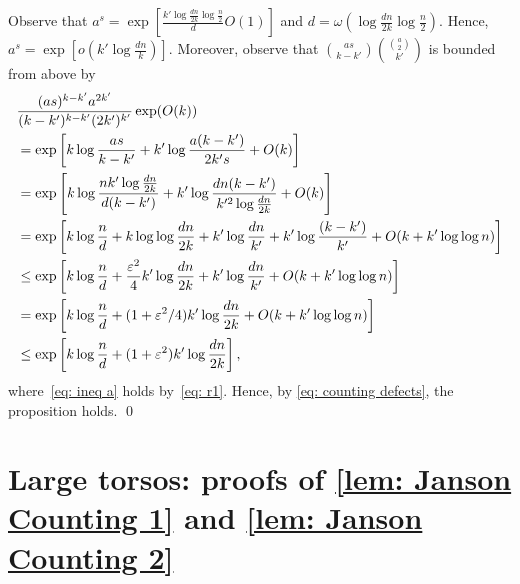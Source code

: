 \documentclass[11pt]{article}
\newcommand{\jc}[1]{{\color{blue}[Jane: #1]}}
\theoremstyle{plain}
\begin{document}
Observe that $a^s = \exp\left[\frac{k'\log\frac{dn}{2k}\log\frac
     {n}{2}}{d}O(1)\right]$ and $d = \omega\left(\log\frac{dn}{2k}\log\frac
     {n}{2}\right)$. Hence, $a^s = \exp\left[o\left(k'\log\frac{dn}{k}\right)\right]$. Moreover, observe that ${as \choose k - k'}{{a \choose 2} \choose k'}$ is bounded from above by
    \begin{align}
         & \frac{(as)^{k - k'}a^{2k'}}{(k - k')^{k - k'}(2k')^{k'}}\exp(O(k))\notag\\
        &= \exp\left[ k\log\frac{as}{k-k'} + k'\log\frac{a(k - k')}{2k's} + O(k)\right]\notag\\
        &=\exp\left[k\log\frac{nk'\log\frac{dn}{2k}}{d(k-k')} + k'\log\frac{dn(k - k')}{k'^2\log\frac{dn}{2k}} + O(k)\right]\notag\\
        &= \exp\left[k\log \frac{n}{d} + k\log\log\frac{dn}{2k} + k'\log\frac{dn}{k'} + k'\log\frac{(k - k')}{k'}+ O(k + k'\log\log n)\right]\notag\\
        &\leq \exp\left[k\log \frac{n}{d} + \frac{\varepsilon^2}{4}k'\log\frac{dn}{2k} + k'\log\frac{dn}{k'} + O(k + k'\log\log n)\right]\label{eq: ineq a}\\
        &= \exp\left[k\log \frac{n}{d} + (1 + \varepsilon^2/4)k'\log\frac{dn}{2k} + O(k + k'\log\log n)\right]\notag\\
        &\leq \exp\left[k\log\frac{n}{d} + (1 + \varepsilon^2)k'\log\frac{dn}{2k}\right],\notag
    \end{align}
    where~\eqref{eq: ineq a} holds by~\eqref{eq: r1}. Hence, by \eqref{eq: counting defects}, the proposition holds.
\qed





\section{Large torsos: proofs of \cref{lem: Janson Counting 1} and \cref{lem: Janson Counting 2}}\label{sec: Janson}
\end{document}
